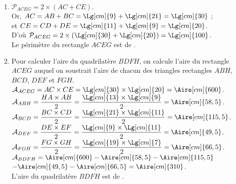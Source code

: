 \begin{corrige}
   \ \\ [-5mm]
   \begin{enumerate}
      \item $\mathcal{P}_{ACEG} =2\times(AC+CE)$. \\
         Or, $AC =AB+BC =\Lg[cm]{9}+\Lg[cm]{21} =\Lg[cm]{30}$ ;\\
         et $CE =CD+DE =\Lg[cm]{11}+\Lg[cm]{9} =\Lg[cm]{20}$. \\
         D'où $\mathcal{P}_{ACEG} =2\times(\Lg[cm]{30}+\Lg[cm]{20}) =\Lg[cm]{100}$. \\
         {\red Le périmètre du rectangle $ACEG$ est de }.
      \item Pour calculer l'aire du quadrilatère $BDFH$, on calcule l'aire du rectangle $ACEG$ auquel on soustrait l'aire de chacun des triangles rectangles $ABH$, $BCD$, $DEF$ et $FGH$. \\
      $\mathcal{A}_{ACEG} =AC\times CE =\Lg[cm]{30}\times\Lg[cm]{20} =\Aire[cm]{600}$. \\ [1.5mm]
      $\mathcal{A}_{ABH} =\dfrac{HA\times AB}{2} =\dfrac{\Lg[cm]{13}\times\Lg[cm]{9}}{2} =\Aire[cm]{58,5}$. \\ [1.5mm]
      $\mathcal{A}_{BCD} =\dfrac{BC\times CD}{2} =\dfrac{\Lg[cm]{21}\times\Lg[cm]{11}}{2} =\Aire[cm]{115,5}$. \\ [1.5mm]
      $\mathcal{A}_{DEF} =\dfrac{DE\times EF}{2} =\dfrac{\Lg[cm]{9}\times\Lg[cm]{11}}{2} =\Aire[cm]{49,5}$. \\ [1mm]
      $\mathcal{A}_{FGH} = \dfrac{FG\times GH}{2} =\dfrac{\Lg[cm]{19}\times\Lg[cm]{7}}{2} =\Aire[cm]{66,5}$. \\ [1.5mm]
      $\mathcal{A}_{BDFH} =\Aire[cm]{600}-\Aire[cm]{58,5}-\Aire[cm]{115,5}$ \\
      \hspace*{14mm} $-\Aire[cm]{49,5}-\Aire[cm]{66,5} =\Aire[cm]{310}$. \\
      {\red L'aire du quadrilatère $BDFH$ est de }.
   \end{enumerate}
\end{corrige}